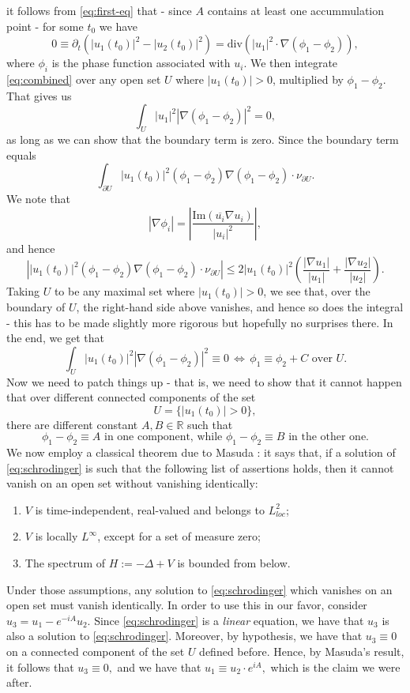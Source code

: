 \documentclass[a4paper,11pt,reqno]{amsart}
\numberwithin{equation}{section}
\theoremstyle{plain} %
\theoremstyle{definition} %
\theoremstyle{remark}
\newcommand{\R}{\mathbb{R}}
\begin{document}
it follows from \eqref{eq:first-eq} that - since $A$ contains at least one accummulation point - for some $t_0$ we have 
\begin{equation}\label{eq:combined}
0 \equiv\partial_t (|u_1(t_0)|^2 - |u_2(t_0)|^2) = \text{div}(|u_1|^2 \cdot \nabla(\phi_1-\phi_2)),
\end{equation}
where $\phi_i$ is the phase function associated with $u_i.$ We then integrate \eqref{eq:combined} over any open set $U$ where $|u_1(t_0)| > 0$, multiplied by $\phi_1 - \phi_2.$ That gives us 
\[
\int_U |u_1|^2 |\nabla (\phi_1 - \phi_2)|^2 = 0,
\]
as long as we can show that the boundary term is zero. Since the boundary term equals 
\[
\int_{\partial U} |u_1(t_0)|^2 (\phi_1 - \phi_2) \nabla(\phi_1-\phi_2)  \cdot \nu_{\partial U}.
\]
We note that 
\[
\left|\nabla \phi_i\right| = \left|  \frac{\text{Im}(\overline{u_i}\nabla u_i)}{|u_i|^2}\right|,
\]
and hence 
\[
\left| |u_1(t_0)|^2 (\phi_1 - \phi_2) \nabla(\phi_1-\phi_2)  \cdot \nu_{\partial U} \right| \le 2|u_1(t_0)|^2 \left(\frac{|\nabla u_1|}{|u_1|} + \frac{|\nabla u_2|}{|u_2|} \right).
\]
Taking $U$ to be any maximal set where $|u_1(t_0)| > 0$, we see that, over the boundary of $U$, the right-hand side above vanishes, and hence so does the integral - this has to be made slightly more rigorous but hopefully no surprises there. In the end, we get that 
\[ 
\int_U |u_1(t_0)|^2 |\nabla(\phi_1 - \phi_2)|^2 \equiv 0 \, \iff \, \phi_1 \equiv \phi_2 + C \text{ over } U. 
\]
Now we need to patch things up - that is, we need to show that it cannot happen that over different connected components of the set  
\begin{equation}\label{eq:non-zero-set}
U = \{ |u_1(t_0)| > 0\}, 
\end{equation} 
there are different constant $A,B \in \R$ such that 
\[
\phi_1 - \phi_2 \equiv A \text{ in one component, while }\phi_1 - \phi_2 \equiv B \text{ in the other one.}
\]
We now employ a classical theorem due to Masuda \cite{masuda1967unique}: it says that, if a solution of \eqref{eq:schrodinger} is such that the following list of assertions holds, then it cannot vanish on an open set without vanishing identically: 
\begin{enumerate}
    \item[(I)] $V$ is time-independent, real-valued and belongs to $L^2_{loc}$;
    \item[(II)] $V$ is locally $L^{\infty}$, except for a set of measure zero; 
    \item[(III)] The spectrum of $H := -\Delta + V$ is bounded from below.
\end{enumerate}
Under those assumptions, any solution to \eqref{eq:schrodinger} which vanishes on an open set must vanish identically. In order to use this in our favor, consider $u_3 = u_1 - e^{-iA}u_2.$ Since \eqref{eq:schrodinger} is a \emph{linear} equation, we have that $u_3$ is also a solution to \eqref{eq:schrodinger}. Moreover, by hypothesis, we have that $u_3 \equiv 0$ on a connected component of the set $U$ defined before. Hence, by Masuda's result, it follows that $u_3 \equiv 0,$ and we have that $u_1 \equiv u_2 \cdot e^{iA},$ which is the claim we were after. 
\end{document}
